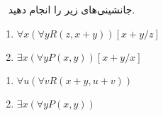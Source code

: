 ~
جانشینی‌های زیر را انجام دهید.
\begin{enumerate}
  \item $\forall x (\forall y R(z, x + y))[x+y/z]$
  \item $\exists x (\forall y P(x, y))[x+y/x]$
\end{enumerate}\quad
\begin{ans}
  \begin{enumerate}
    \item $\forall u (\forall v R(x + y, u + v))$
    \item $\exists x (\forall y P(x, y))$
  \end{enumerate}
\end{ans}